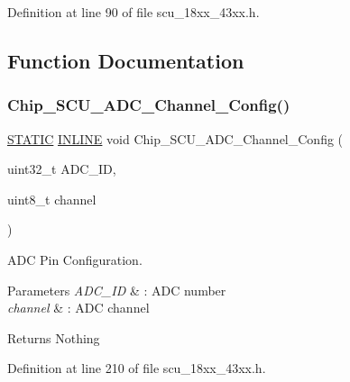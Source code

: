 Definition at line 90 of file scu\+\_\+18xx\+\_\+43xx.\+h.



\subsection{Function Documentation}
\mbox{\label{group___s_c_u__18_x_x__43_x_x_ga198684376606623332684569065a6d27}} 
\subsubsection{\texorpdfstring{Chip\+\_\+\+S\+C\+U\+\_\+\+A\+D\+C\+\_\+\+Channel\+\_\+\+Config()}{Chip\_SCU\_ADC\_Channel\_Config()}}
{\footnotesize\ttfamily \hyperlink{group___l_p_c___types___public___macros_ga10b2d890d871e1489bb02b7e70d9bdfb}{S\+T\+A\+T\+IC} \hyperlink{spifi__18xx__43xx_8h_a2eb6f9e0395b47b8d5e3eeae4fe0c116}{I\+N\+L\+I\+NE} void Chip\+\_\+\+S\+C\+U\+\_\+\+A\+D\+C\+\_\+\+Channel\+\_\+\+Config (\begin{DoxyParamCaption}\item[{uint32\+\_\+t}]{A\+D\+C\+\_\+\+ID,  }\item[{uint8\+\_\+t}]{channel }\end{DoxyParamCaption})}



A\+DC Pin Configuration. 


\begin{DoxyParams}{Parameters}
{\em A\+D\+C\+\_\+\+ID} & \+: A\+DC number \\
\hline
{\em channel} & \+: A\+DC channel \\
\hline
\end{DoxyParams}
\begin{DoxyReturn}{Returns}
Nothing 
\end{DoxyReturn}


Definition at line 210 of file scu\+\_\+18xx\+\_\+43xx.\+h.

